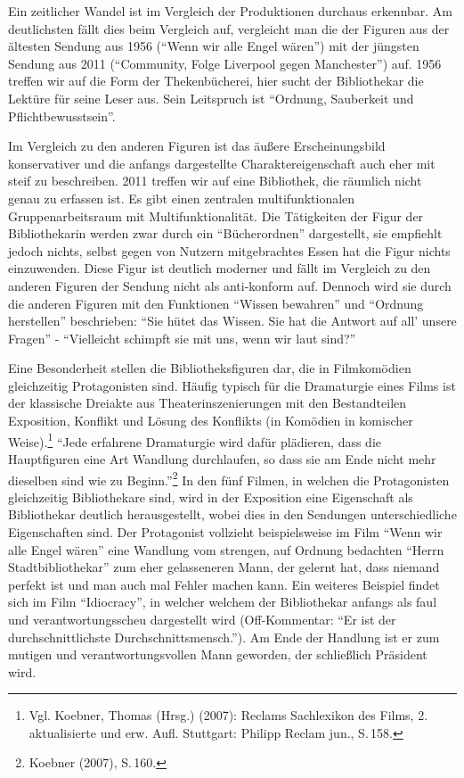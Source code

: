 
Ein zeitlicher Wandel ist im Vergleich der Produktionen durchaus
erkennbar. Am deutlichsten fällt dies beim Vergleich auf, vergleicht man
die der Figuren aus der ältesten Sendung aus 1956 (\enquote{Wenn wir
alle Engel wären}) mit der jüngsten Sendung aus 2011
(\enquote{Community, Folge Liverpool gegen Manchester}) auf. 1956
treffen wir auf die Form der Thekenbücherei, hier sucht der Bibliothekar
die Lektüre für seine Leser aus. Sein Leitspruch ist \enquote{Ordnung,
Sauberkeit und Pflichtbewusstsein}.

Im Vergleich zu den anderen Figuren ist das äußere Erscheinungsbild
konservativer und die anfangs dargestellte Charaktereigenschaft auch
eher mit steif zu beschreiben. 2011 treffen wir auf eine
Bibliothek, die räumlich nicht genau zu erfassen ist. Es gibt einen
zentralen multifunktionalen Gruppenarbeitsraum mit Multifunktionalität.
Die Tätigkeiten der Figur der Bibliothekarin werden zwar durch ein
\enquote{Bücherordnen} dargestellt, sie empfiehlt jedoch nichts, selbst
gegen von Nutzern mitgebrachtes Essen hat die Figur nichts einzuwenden.
Diese Figur ist deutlich moderner und fällt im Vergleich zu den anderen
Figuren der Sendung nicht als anti-konform auf. Dennoch wird
sie durch die anderen Figuren mit den Funktionen \enquote{Wissen
bewahren} und \enquote{Ordnung herstellen} beschrieben: \enquote{Sie
hütet das Wissen. Sie hat die Antwort auf all' unsere Fragen} -
\enquote{Vielleicht schimpft sie mit uns, wenn wir laut sind?}

Eine Besonderheit stellen die Bibliotheksfiguren dar, die in
Filmkomödien gleichzeitig Protagonisten sind. Häufig typisch für die
Dramaturgie eines Films ist der klassische Dreiakte aus
Theaterinszenierungen mit den Bestandteilen Exposition, Konflikt und
Lösung des Konflikts (in Komödien in komischer Weise).\footnote{Vgl.
  Koebner, Thomas (Hrsg.) (2007): Reclams Sachlexikon des Films, 2.
  aktualisierte und erw. Aufl. Stuttgart: Philipp Reclam jun., S.\,158.}
\enquote{Jede erfahrene Dramaturgie wird dafür plädieren, dass die
Hauptfiguren eine Art Wandlung durchlaufen, so dass sie am Ende nicht
mehr dieselben sind wie zu Beginn.}\footnote{Koebner (2007), S.\,160.} In
den fünf Filmen, in welchen die Protagonisten gleichzeitig Bibliothekare
sind, wird in der Exposition eine Eigenschaft als Bibliothekar deutlich
herausgestellt, wobei dies in den Sendungen unterschiedliche
Eigenschaften sind. Der Protagonist vollzieht beispielsweise im Film
\enquote{Wenn wir alle Engel wären} eine Wandlung vom strengen, auf
Ordnung bedachten \enquote{Herrn Stadtbibliothekar} zum eher
gelasseneren Mann, der gelernt hat, dass niemand perfekt ist und man
auch mal Fehler machen kann. Ein weiteres Beispiel findet sich im Film
\enquote{Idiocracy}, in welcher welchem der Bibliothekar anfangs als
faul und verantwortungsscheu dargestellt wird (Off-Kommentar:
\enquote{Er ist der durchschnittlichste Durchschnittsmensch.}). Am Ende
der Handlung ist er zum mutigen und verantwortungsvollen Mann geworden,
der schließlich Präsident wird.

